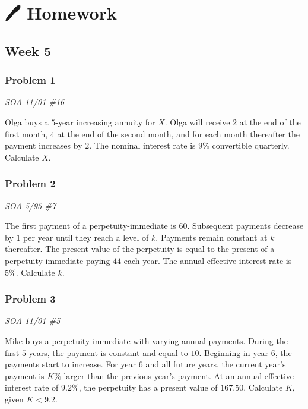 \documentclass[
]{book}
\begin{document}
\hypertarget{homework}{%
\chapter*{🖊️ Homework}\label{homework}}

\hypertarget{week-5}{%
\section*{Week 5}\label{week-5}}

\hypertarget{problem-1}{%
\subsection*{Problem 1}\label{problem-1}}

\emph{SOA 11/01 \#16}

Olga buys a \(5\)-year increasing annuity for \(X\). Olga will receive \(2\) at the end of the first month, \(4\) at the end of the second month, and for each month thereafter the payment increases by \(2\). The nominal interest rate is \(9\%\) convertible quarterly. Calculate \(X\).

\hypertarget{problem-2}{%
\subsection*{Problem 2}\label{problem-2}}

\emph{SOA 5/95 \#7}

The first payment of a perpetuity-immediate is \(60\). Subsequent payments decrease by \(1\) per year until they reach a level of \(k\). Payments remain constant at \(k\) thereafter. The present value of the perpetuity is equal to the present of a perpetuity-immediate paying \(44\) each year. The annual effective interest rate is \(5\%\). Calculate \(k\).

\hypertarget{problem-3}{%
\subsection*{Problem 3}\label{problem-3}}

\emph{SOA 11/01 \#5}

Mike buys a perpetuity-immediate with varying annual payments. During the first \(5\) years, the payment is constant and equal to \(10\). Beginning in year \(6\), the payments start to increase. For year \(6\) and all future years, the current year's payment is \(K\%\) larger than the previous year's payment. At an annual effective interest rate of \(9.2\%\), the perpetuity has a present value of \(167.50\). Calculate \(K\), given \(K < 9.2\).
\end{document}
